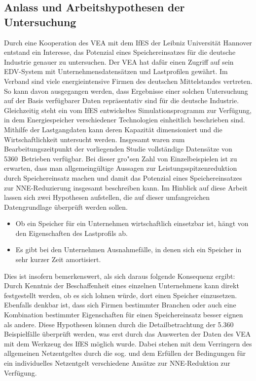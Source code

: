\subsection{Anlass und Arbeitshypothesen der Untersuchung}
\label{Ansatz}
Durch eine Kooperation des \ac{VEA} mit dem \ac{IfES} der Leibniz Universität Hannover entstand ein Interesse, das Potenzial eines Speichereinsatzes für die deutsche Industrie genauer zu untersuchen.
Der \ac{VEA} hat dafür einen Zugriff auf sein EDV-System mit Unternehmensdatensätzen und Lastprofilen gewährt.
Im Verband sind viele energieintensive Firmen des deutschen Mittelstandes vertreten.
So kann davon ausgegangen werden, dass Ergebnisse einer solchen Untersuchung auf der Basis verfügbarer Daten repräsentativ sind für die deutsche Industrie.
Gleichzeitig steht ein vom \ac{IfES} entwickeltes Simulationsprogramm zur Verfügung, in dem Energiespeicher verschiedener Technologien einheitlich beschrieben sind.
Mithilfe der Lastgangdaten kann deren Kapazität dimensioniert und die Wirtschaftlichkeit untersucht werden.
Insgesamt waren zum Bearbeitungszeitpunkt der vorliegenden Studie vollständige Datensätze von 5360~Betrieben verfügbar.
Bei dieser gro"sen Zahl von Einzelbeispielen ist zu erwarten, dass man allgemeingültige Aussagen zur Leistungsspitzenreduktion durch Speichereinsatz machen und damit das Potenzial eines Speichereinsatzes zur \ac{NNE}-Reduzierung insgesamt beschreiben kann.
%
Im Hinblick auf diese Arbeit lassen sich zwei Hypothesen aufstellen, die auf dieser umfangreichen Datengrundlage überprüft werden sollen.
\begin{itemize}
\item Ob ein Speicher für ein Unternehmen wirtschaftlich einsetzbar ist, hängt von den Eigenschaften des Lastprofils ab.
\item Es gibt bei den Unternehmen Ausnahmefälle, in denen sich ein Speicher in sehr kurzer Zeit amortisiert.
\end{itemize}
Dies ist insofern bemerkenswert, als sich daraus folgende Konsequenz ergibt:
Durch Kenntnis der Beschaffenheit eines einzelnen Unternehmens kann direkt festgestellt werden, ob es sich lohnen würde, dort einen Speicher einzusetzen.
Ebenfalls denkbar ist, dass sich Firmen bestimmter Branchen oder auch eine Kombination bestimmter Eigenschaften für einen Speichereinsatz besser eignen als andere.
Diese Hypothesen können durch die Detailbetrachtung der 5.360 Beispielfälle überprüft werden, was erst durch das Auswerten der Daten des \ac{VEA} mit dem Werkzeug des \ac{IfES} möglich wurde.
Dabei stehen mit dem Verringern des allgemeinen Netzentgeltes durch die sog.  und dem Erfüllen der Bedingungen für ein individuelles Netzentgelt verschiedene Ansätze zur \ac{NNE}-Reduktion zur Verfügung.
